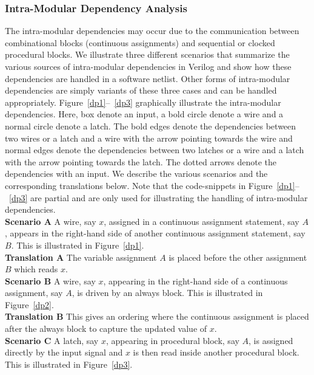 \subsubsection{Intra-Modular Dependency Analysis}
%
The intra-modular dependencies may occur due to the communication between
combinational blocks (continuous assignments) and sequential or clocked 
procedural blocks.  We illustrate three different scenarios that summarize 
the various sources of intra-modular dependencies in Verilog and show 
how these dependencies are handled in a software netlist.  Other forms of 
intra-modular dependencies are simply variants of these three cases 
and can be handled appropriately.
%
Figure~\ref{dp1}--~\ref{dp3} graphically illustrate the intra-modular dependencies.  
%
Here, box denote an input, a bold circle denote a wire and a normal circle
denote a latch.  The bold edges denote the dependencies between two wires or a latch 
and a wire with the arrow pointing towards the wire and normal edges denote the 
dependencies between two latches or a wire and a latch with the arrow pointing
towards the latch. The dotted arrows denote the dependencies with an input. 
%
We describe the various scenarios and the corresponding translations below. 
Note that the code-snippets in Figure~\ref{dp1}--~\ref{dp3} are partial 
and are only used for illustrating the handling of intra-modular dependencies.
\\
%
\noindent \textbf{Scenario A}  A wire, say $x$,  assigned in a continuous assignment 
statement, say $A$, appears in the right-hand side of another continuous assignment 
statement, say $B$.  This is illustrated in Figure~\ref{dp1}.\\

\noindent \textbf{Translation A} The variable assignment $A$ is placed before the other assignment $B$ 
which reads $x$.  \\

\noindent \textbf{Scenario B} A wire, say $x$, appearing in the right-hand side of a 
continuous assignment, say $A$, is driven by an always block.  This is illustrated in 
Figure~\ref{dp2}.\\

\noindent \textbf{Translation B} This gives an ordering where the continuous assignment is 
placed after the always block to capture the updated value of $x$. \\

\noindent \textbf{Scenario C} A latch, say $x$, appearing in procedural block, 
say $A$, is assigned directly by the input signal and $x$ is then read inside 
another procedural block. This is illustrated in Figure~\ref{dp3}.\\

